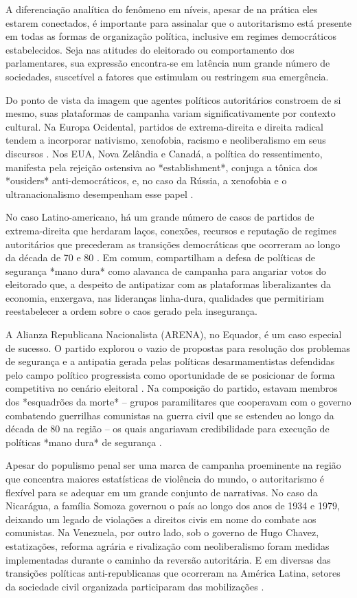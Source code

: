 \documentclass[
12pt,				%
openright,			%
twoside,			%
a4paper,			%
english,			%
french,				%
spanish,			%
brazil				%
]{abntex2}
\begin{document}
A diferenciação analítica do fenômeno em níveis, apesar de na prática eles estarem conectados, é importante para assinalar que o autoritarismo está presente em todas as formas de organização política, inclusive em regimes democráticos estabelecidos. Seja nas atitudes do eleitorado ou comportamento dos parlamentares, sua expressão encontra-se em latência num grande número de sociedades, suscetível a fatores que estimulam ou restringem sua emergência. 

Do ponto de vista da imagem que agentes políticos autoritários constroem de si mesmo, suas plataformas de campanha variam significativamente por contexto cultural. Na Europa Ocidental, partidos de extrema-direita e direita radical tendem a incorporar nativismo, xenofobia, racismo e neoliberalismo em seus discursos \cite{mudde2009populist}. Nos EUA, Nova Zelândia e Canadá, a política do ressentimento, manifesta pela rejeição ostensiva ao *establishment*, conjuga a tônica dos *ousiders* anti-democráticos, e, no caso da Rússia, a xenofobia e o ultranacionalismo desempenham esse papel \cite{norris2005radical}. 

No caso Latino-americano, há um grande número de casos de partidos de extrema-direita que herdaram laços, conexões, recursos e reputação de regimes autoritários que precederam as transições democráticas que ocorreram ao longo da década de 70 e 80 \cite{loxton2014authoritarian}. Em comum, compartilham a defesa de políticas de segurança *mano dura* como alavanca de campanha para angariar votos do eleitorado que, a despeito de antipatizar com as plataformas liberalizantes da economia, enxergava, nas lideranças linha-dura, qualidades que permitiriam reestabelecer a ordem sobre o caos gerado pela insegurança.

A Alianza Republicana Nacionalista (ARENA), no Equador, é um caso especial de sucesso. O partido explorou o vazio de propostas para resolução dos problemas de segurança e a antipatia gerada pelas políticas desarmamentistas defendidas pelo campo político progressista como oportunidade de se posicionar de forma competitiva no cenário eleitoral \cite{holland2013right}. Na composição do partido, estavam membros dos *esquadrões da morte* -- grupos paramilitares que cooperavam com o governo combatendo guerrilhas comunistas na guerra civil que se estendeu ao longo da década de 80 na região -- os quais angariavam credibilidade para execução de políticas *mano dura* de segurança \cite{loxton2014authoritarian}.

Apesar do populismo penal ser uma marca de campanha proeminente na região que concentra maiores estatísticas de violência do mundo, o autoritarismo é flexível para se adequar em um grande conjunto de narrativas. No caso da Nicarágua, a família Somoza governou o país ao longo dos anos de 1934 e 1979, deixando um legado de violações a direitos civis em nome do combate aos comunistas. Na Venezuela, por outro lado, sob o governo de Hugo Chavez, estatizações, reforma agrária e rivalização com neoliberalismo foram medidas implementadas durante o caminho da reversão autoritária. E em diversas das transições políticas anti-republicanas que ocorreram na América Latina, setores da sociedade civil organizada participaram das mobilizações \cite{valenzuela2004latin}.
\end{document}

